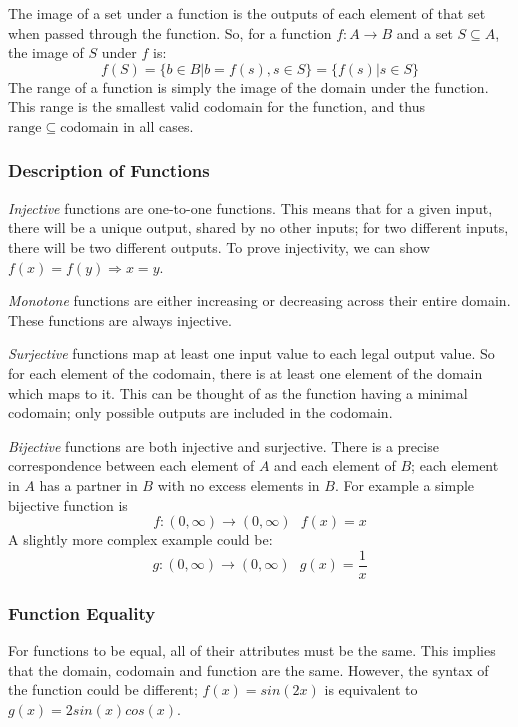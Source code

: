 \documentclass[12pt]{report}
\begin{document}
\begin{flushleft}
\bigskip
The image of a set under a function is the outputs of each element of that set when passed through
the function. So, for a function \(f: A \rightarrow B\) and a set \(S \subseteq A\), the image of
\(S\) under \(f\) is:
\[f(S) = \{b \in B | b = f(s), s \in S\} = \{f(s) | s \in S\}\]
The range of a function is simply the image of the domain under the function. This range
is the smallest valid codomain for the function, and thus \(\mathrm{range} \subseteq \mathrm{codomain}\)
in all cases.

\subsubsection*{Description of Functions}
\textit{Injective} functions are one-to-one functions. This means that for a given input,
there will be a unique output, shared by no other inputs; for two different inputs, there will
be two different outputs. To prove injectivity, we can show \(f(x) = f(y) \Rightarrow x = y\).

\bigskip
\textit{Monotone} functions are either increasing or decreasing across their entire domain.
These functions are always injective.

\bigskip
\textit{Surjective} functions map at least one input value to each legal output value. So
for each element of the codomain, there is at least one element of the domain which maps to it.
This can be thought of as the function having a minimal codomain; only possible outputs are
included in the codomain.

\bigskip
\textit{Bijective} functions are both injective and surjective. There is a precise
correspondence between each element of \(A\) and each element of \(B\); each element in \(A\) has 
a partner in \(B\) with no excess elements in \(B\). For example a simple bijective function is
\[f: (0, \infty) \rightarrow (0, \infty)\:\:\:f(x) = x\]
A slightly more complex example could be:
\[g: (0, \infty) \rightarrow (0, \infty)\:\:\:g(x) = \frac{1}{x}\]

\subsubsection*{Function Equality}
For functions to be equal, all of their attributes must be the same. This implies that
the domain, codomain and function are the same. However, the syntax of the 
function could be different; \(f(x) = sin(2x)\) is equivalent to \(g(x) = 2sin(x)cos(x)\). 


\end{flushleft}
\end{document}
